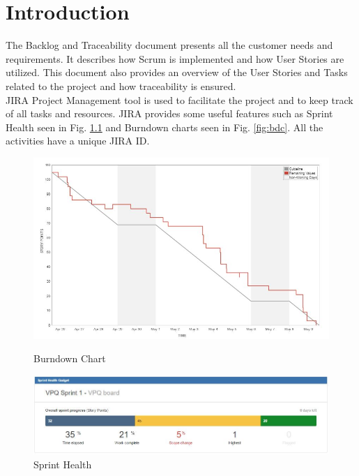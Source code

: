 \chapter{Introduction}
The Backlog and Traceability document presents all the customer needs and requirements. It describes how Scrum is implemented and how User Stories are utilized. This document also provides an overview of the User Stories and Tasks related to the project and how traceability is ensured. \\

JIRA Project Management tool is used to facilitate the project and to keep track of all tasks and resources. JIRA provides some useful features such as Sprint Health seen in Fig. \ref{fig:sh} and Burndown charts seen in Fig. \ref{fig:bdc}. All the activities have a unique JIRA ID.\\
 

\begin{figure}[h]
        \centering
         \begin{minipage}[b]{0.3\textwidth}
            \includegraphics[width = 1\textwidth]{VAPIQ-PICTURES/BDSprint8}
            \caption{Burndown Chart}
            \label{fig:bdc}
        \end{minipage}
        \hfill
        \begin{minipage}[b]{0.6\textwidth}
            \includegraphics[width = 1\textwidth]{VAPIQ-PICTURES/SH}
            \caption{Sprint Health}
            \label{fig:sh}
        \end{minipage}
\end{figure}


\vspace*{1cm}


